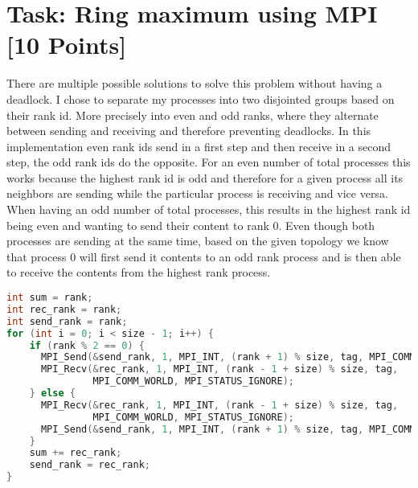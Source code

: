 \section{Task: Ring maximum using MPI [10 Points]}
There are multiple possible solutions to solve this problem without having a deadlock.
I chose to separate my processes into two disjointed groups based on their rank id. More precisely into even and odd ranks, where they alternate between sending and receiving and therefore preventing deadlocks. In this implementation even rank ids send in a first step and then receive in a second step, the odd rank ids do the opposite.
For an even number of total processes this works because the highest rank id is odd and therefore for a given process all its neighbors are sending while the particular process is receiving and vice versa.
When having an odd number of total processes, this results in the highest rank id being even and wanting to send their content to rank 0. Even though both processes are sending at the same time, based on the given topology we know that process 0 will first send it contents to an odd rank process and is then able to receive the contents from the highest rank process.


\begin{lstlisting}[language=C++, caption=Ring topology using alternating send and receive, label=lst:ring]
int sum = rank;
int rec_rank = rank;
int send_rank = rank;
for (int i = 0; i < size - 1; i++) {
	if (rank % 2 == 0) {
	  MPI_Send(&send_rank, 1, MPI_INT, (rank + 1) % size, tag, MPI_COMM_WORLD);
	  MPI_Recv(&rec_rank, 1, MPI_INT, (rank - 1 + size) % size, tag,
			   MPI_COMM_WORLD, MPI_STATUS_IGNORE);
	} else {
	  MPI_Recv(&rec_rank, 1, MPI_INT, (rank - 1 + size) % size, tag,
			   MPI_COMM_WORLD, MPI_STATUS_IGNORE);
	  MPI_Send(&send_rank, 1, MPI_INT, (rank + 1) % size, tag, MPI_COMM_WORLD);
	}
	sum += rec_rank;
	send_rank = rec_rank;
}
\end{lstlisting}

